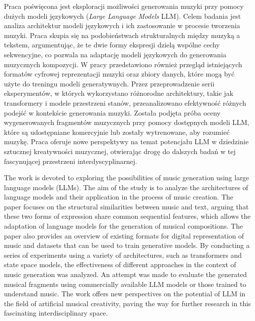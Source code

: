 \documentclass[data-science]{agh-wi} %
\author{Filip Ręka}
\begin{document}
\frontmatter %
\maketitle %

\begin{abstractPL}
    Praca poświęcona jest eksploracji możliwości generowania muzyki przy pomocy dużych modeli językowych (\textit{Large Language Models} LLM). Celem badania jest analiza architektur modeli językowych i ich zastosowanie w procesie tworzenia muzyki. Praca skupia się na podobieństwach strukturalnych między muzyką a tekstem, argumentując, że te dwie formy ekspresji dzielą wspólne cechy sekwencyjne, co pozwala na adaptację modeli językowych do generowania muzycznych kompozycji. W pracy przedstawiono również przegląd istniejących formatów cyfrowej reprezentacji muzyki oraz zbiory danych, które mogą być użyte do treningu modeli generatywnych. Przez przeprowadzenie serii eksperymentów, w których wykorzystano różnorodne architektury, takie jak transformery i modele przestrzeni stanów, przeanalizowano efektywność różnych podejść w kontekście generowania muzyki. Została podjęta próba oceny wygenerowanych fragmentów muzycznych przy pomocy dostępnych modeli LLM, które są udostępniane komercyjnie lub zostały wytrenowane, aby rozumieć muzykę. Praca oferuje nowe perspektywy na temat potencjału LLM w dziedzinie sztucznej kreatywności muzycznej, otwierając drogę do dalszych badań w tej fascynującej przestrzeni interdyscyplinarnej.
\end{abstractPL}
\begin{abstractEN}
    The work is devoted to exploring the possibilities of music generation using large language models (LLMs). The aim of the study is to analyze the architectures of language models and their application in the process of music creation. The paper focuses on the structural similarities between music and text, arguing that these two forms of expression share common sequential features, which allows the adaptation of language models for the generation of musical compositions. The paper also provides an overview of existing formats for digital representation of music and datasets that can be used to train generative models. By conducting a series of experiments using a variety of architectures, such as transformers and state space models, the effectiveness of different approaches in the context of music generation was analyzed. An attempt was made to evaluate the generated musical fragments using commercially available LLM models or those trained to understand music. The work offers new perspectives on the potential of LLM in the field of artificial musical creativity, paving the way for further research in this fascinating interdisciplinary space.
\end{abstractEN}
\end{document}

